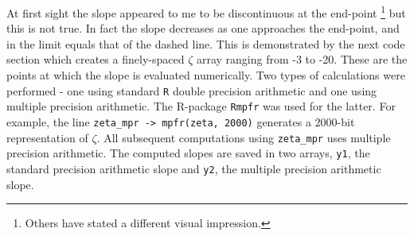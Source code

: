 \documentclass[
]{book}
\begin{document}
At first sight the slope appeared to me to be discontinuous at the end-point \footnote{Others have stated a different visual impression.} but this is not true. In fact the slope decreases as one approaches the end-point, and in the limit equals that of the dashed line. This is demonstrated by the next code section which creates a finely-spaced \(\zeta\) array ranging from -3 to -20. These are the points at which the slope is evaluated numerically. Two types of calculations were performed - one using standard \texttt{R} double precision arithmetic and one using multiple precision arithmetic. The R-package \texttt{Rmpfr} was used for the latter. For example, the line \texttt{zeta\_mpr\ -\textgreater{}\ mpfr(zeta,\ 2000)} generates a 2000-bit representation of \(\zeta\). All subsequent computations using \texttt{zeta\_mpr} uses multiple precision arithmetic. The computed slopes are saved in two arrays, \texttt{y1}, the standard precision arithmetic slope and \texttt{y2}, the multiple precision arithmetic slope.
\end{document}
